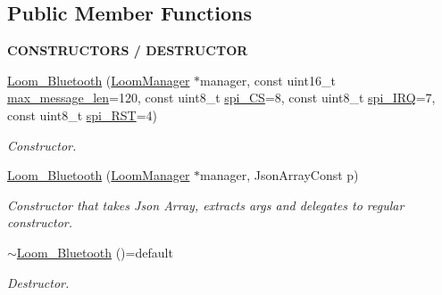 \subsection*{Public Member Functions}
\begin{Indent}{\bf C\+O\+N\+S\+T\+R\+U\+C\+T\+O\+RS / D\+E\+S\+T\+R\+U\+C\+T\+OR}\par
\begin{DoxyCompactItemize}
\item 
\hyperlink{class_loom___bluetooth_a0e4547eb83e0df8bfee05cbb862959d5}{Loom\+\_\+\+Bluetooth} (\hyperlink{class_loom_manager}{Loom\+Manager} $\ast$manager, const uint16\+\_\+t \hyperlink{class_loom_comm_plat_a2b4f69c2ec15028f5f281c3d1d399dba}{max\+\_\+message\+\_\+len}=120, const uint8\+\_\+t \hyperlink{class_loom___bluetooth_a111aeae48c0ea364b47b3d8f3536bd7c}{spi\+\_\+\+CS}=8, const uint8\+\_\+t \hyperlink{class_loom___bluetooth_a8ef44f1f6220e7272aeca00a0991a3c7}{spi\+\_\+\+I\+RQ}=7, const uint8\+\_\+t \hyperlink{class_loom___bluetooth_a9b7f8f41e29fce31bcd8366e93edd7a6}{spi\+\_\+\+R\+ST}=4)
\begin{DoxyCompactList}\small\item\em Constructor. \end{DoxyCompactList}\item 
\hyperlink{class_loom___bluetooth_a0751e5f9f4eac6bc1f9cba0fbc31c2d9}{Loom\+\_\+\+Bluetooth} (\hyperlink{class_loom_manager}{Loom\+Manager} $\ast$manager, Json\+Array\+Const p)
\begin{DoxyCompactList}\small\item\em Constructor that takes Json Array, extracts args and delegates to regular constructor. \end{DoxyCompactList}\item 
\hyperlink{class_loom___bluetooth_a14659e58247ac0dab7c21fe10fd512e6}{$\sim$\+Loom\+\_\+\+Bluetooth} ()=default
\begin{DoxyCompactList}\small\item\em Destructor. \end{DoxyCompactList}\end{DoxyCompactItemize}
\end{Indent}
